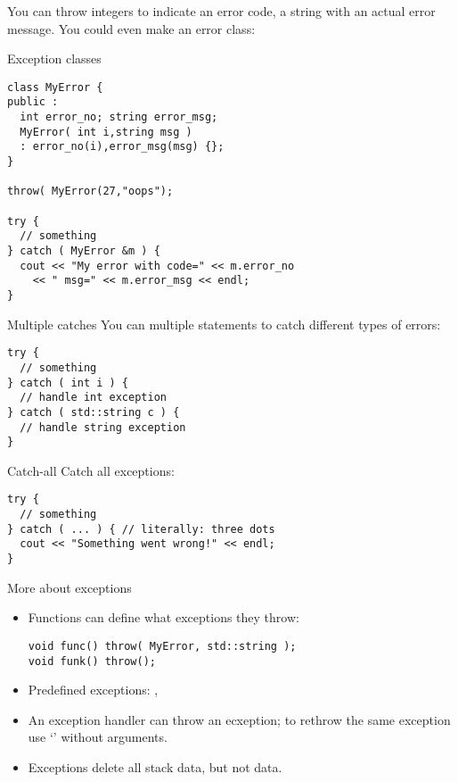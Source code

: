 You can throw integers to indicate an error code, a string with an
actual error message. You could even make an error class:

\begin{block}{Exception classes}
  \label{sl:exception-class}
\begin{verbatim}
class MyError {
public :
  int error_no; string error_msg;
  MyError( int i,string msg )
  : error_no(i),error_msg(msg) {};
}

throw( MyError(27,"oops");

try {
  // something
} catch ( MyError &m ) {
  cout << "My error with code=" << m.error_no
    << " msg=" << m.error_msg << endl;
}
\end{verbatim}
\end{block}

\begin{block}{Multiple catches}
  \label{sl:exception-catches}
  You can multiple  statements to catch different types of
  errors:
\begin{verbatim}
try {
  // something
} catch ( int i ) {
  // handle int exception
} catch ( std::string c ) {
  // handle string exception
}
\end{verbatim}
\end{block}

\begin{block}{Catch-all}
  \label{sl:exception-catchall}
  Catch all exceptions:
\begin{verbatim}
try {
  // something
} catch ( ... ) { // literally: three dots
  cout << "Something went wrong!" << endl;
}
\end{verbatim}
\end{block}

\begin{block}{More about exceptions}
  \label{sl:exception-more}
  \begin{itemize}
  \item Functions can define what exceptions they throw: 
\begin{verbatim}
void func() throw( MyError, std::string );
void funk() throw();
\end{verbatim}
\item Predefined exceptions: ,
\item An exception handler can throw an ecxeption; to rethrow the same
  exception use `' without arguments.
\item Exceptions delete all stack data, but not  data.
  \end{itemize}
\end{block}
